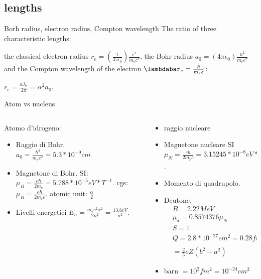 \subsection{lengths}

\begin{frame}{Borh radius, electron radius, Compton wavelength}
    The ratio of three characteristic lengths:

the classical electron radius $r_e=(\frac{1}{4\pi\epsilon_0})\frac{e^2}{m_ec^2}$, the Bohr radius $a_0=(4\pi\epsilon_0)\frac{\hbar^2}{m_ee^2}$  and the Compton wavelength of the electron $\lambdabar_e=\frac{\hbar}{m_ec}$:

$r_e=\frac{\alpha\lambda_e}{2\pi}=\alpha^2a_0$.
\end{frame}

\begin{frame}{Atom vs nucleus}
\begin{columns}[T]
\begin{column}{0.5\textwidth}
Atomo d'idrogeno:
    \begin{itemize}
        \item Raggio di Bohr.
$a_0=\frac{\hbar^2}{m_ee^2}=5.3*10^{-9} cm$
\item Magnetone di Bohr.
SI: $\mu_B=\frac{e\hbar}{2m_e}=5.788*10^{-5}eV*T^{-1}$.
cgs: $\mu_B=\frac{e\hbar}{2m_ec}$.
atomic unit: $\frac{\alpha}{2}$
\item  Livelli energetici $E_n=\frac{m_ec^2\alpha^2}{2n^2}=\frac{13.6eV}{n^2}$.
    \end{itemize}
\end{column}
\begin{column}{0.5\textwidth}
    \begin{itemize}
        \item    raggio nucleare
        \item Magnetone nucleare
SI $\mu_N=\frac{e\hbar}{2m_pc}=3.15245*10^{-8}eV*T^{-1}=\frac{\mu_B}{1836}$.
\item Momento di quadrupolo.
\item Deutone.
\begin{align*}
&B=2.22 MeV\\
&\mu_d=0.8574376\mu_N\\
&S=1\\
&Q=2.8*10^{-27}cm^2=0.28fm^2(Q_{zz})\\
&=\frac{2}{5}eZ(b^2-a^2)
\end{align*}
\item barn $=10^2 fm^2=10^{-24}cm^2$
    \end{itemize}
\end{column}
\end{columns}
\end{frame}

